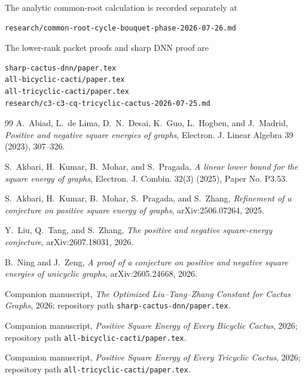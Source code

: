 \documentclass[11pt]{article}
\theoremstyle{remark}
\begin{document}
The analytic common-root calculation is recorded separately at
\begin{verbatim}
research/common-root-cycle-bouquet-phase-2026-07-26.md
\end{verbatim}
The lower-rank packet proofs and sharp DNN proof are
\begin{verbatim}
sharp-cactus-dnn/paper.tex
all-bicyclic-cacti/paper.tex
all-tricyclic-cacti/paper.tex
research/c3-c3-cq-tricyclic-cactus-2026-07-25.md
\end{verbatim}

\begin{thebibliography}{99}
A.~Abiad, L.~de Lima, D.~N.~Desai, K.~Guo, L.~Hogben, and J.~Madrid,
\emph{Positive and negative square energies of graphs},
Electron. J. Linear Algebra 39 (2023), 307--326.

S.~Akbari, H.~Kumar, B.~Mohar, and S.~Pragada,
\emph{A linear lower bound for the square energy of graphs},
Electron. J. Combin. 32(3) (2025), Paper No. P3.53.

S.~Akbari, H.~Kumar, B.~Mohar, S.~Pragada, and S.~Zhang,
\emph{Refinement of a conjecture on positive square energy of graphs},
arXiv:2506.07264, 2025.

Y.~Liu, Q.~Tang, and S.~Zhang,
\emph{The positive and negative square-energy conjecture},
arXiv:2607.18031, 2026.

B.~Ning and J.~Zeng,
\emph{A proof of a conjecture on positive and negative square energies of
unicyclic graphs}, arXiv:2605.24668, 2026.

Companion manuscript, \emph{The Optimized Liu--Tang--Zhang Constant for
Cactus Graphs}, 2026; repository path \texttt{sharp-cactus-dnn/paper.tex}.

Companion manuscript, \emph{Positive Square Energy of Every Bicyclic Cactus},
2026; repository path \texttt{all-bicyclic-cacti/paper.tex}.

Companion manuscript, \emph{Positive Square Energy of Every Tricyclic Cactus},
2026; repository path \texttt{all-tricyclic-cacti/paper.tex}.
\end{thebibliography}
\end{document}
